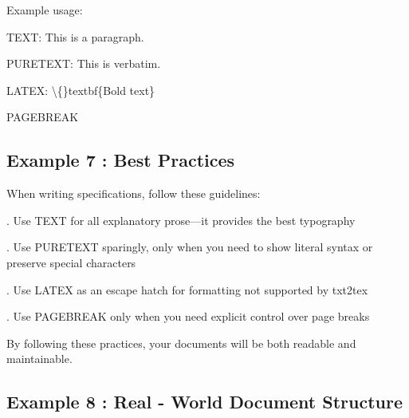 \documentclass[a4paper,10pt,fleqn]{article}
\begin{document}
\bigskip

Example usage:

\bigskip

\bigskip

TEXT: This is a paragraph.

\bigskip

\bigskip

PURETEXT: This is verbatim.

\bigskip

\bigskip

LATEX: \textbackslash\{\}textbf\{Bold text\}

\bigskip

\bigskip

PAGEBREAK

\bigskip

\subsection*{Example 7 : Best Practices}

\noindent When writing specifications, follow these guidelines:

\bigskip

. Use TEXT for all explanatory prose—it provides the best typography

\bigskip

. Use PURETEXT sparingly, only when you need to show literal syntax or preserve special characters

\bigskip

. Use LATEX as an escape hatch for formatting not supported by txt2tex

\bigskip

. Use PAGEBREAK only when you need explicit control over page breaks

\bigskip

\vspace{1cm}

\noindent By following these practices, your documents will be both readable and maintainable.

\bigskip

\subsection*{Example 8 : Real - World Document Structure}
\end{document}
